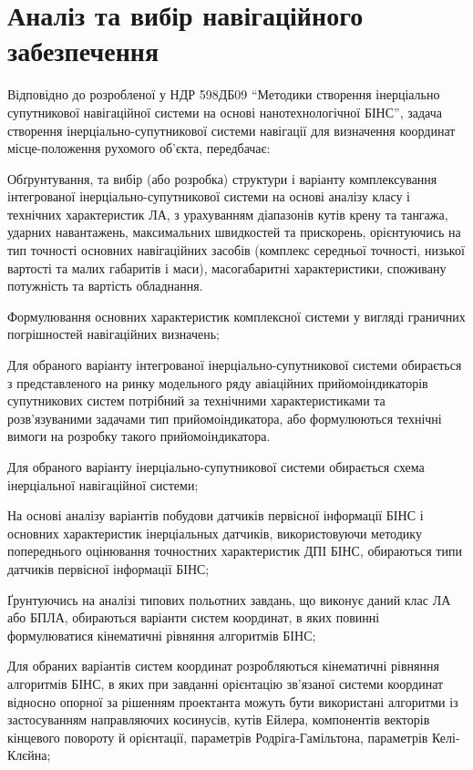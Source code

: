 \section{Аналіз та вибір навігаційного забезпечення}

Відповідно до розробленої у НДР 598ДБ09 ``Методики створення інерціально супутникової навігаційної системи на основі нанотехнологічної БІНС”, задача створення інерціально-супутникової системи навігації для визначення координат місце-положення рухомого об'єкта, передбачає:

Обґрунтування, та вибір (або розробка) структури і варіанту комплексування 
інтегрованої інерціально-супутникової системи на основі аналізу класу і 
технічних характеристик ЛА, з урахуванням діапазонів кутів крену та тангажа, 
ударних навантажень, максимальних швидкостей та прискорень, орієнтуючись на 
тип точності основних навігаційних засобів (комплекс середньої точності, 
низької вартості та малих габаритів і маси), масогабаритні характеристики, 
споживану потужність та вартість обладнання. 

Формулювання основних характеристик комплексної системи у вигляді граничних 
погрішностей навігаційних визначень;

Для обраного варіанту інтегрованої інерціально-супутникової системи 
обирається з представленого на ринку модельного ряду авіаційних 
прийомоіндикаторів супутникових систем потрібний за технічними 
характеристиками та розв'язуваними задачами тип прийомоіндикатора, або 
формулюються технічні вимоги  на розробку такого прийомоіндикатора. 

Для обраного варіанту інерціально-супутникової системи обирається схема 
інерціальної навігаційної системи;

На основі аналізу варіантів побудови датчиків первісної інформації БІНС
і основних характеристик інерціальных датчиків, використовуючи методику 
попереднього оцінювання точностних характеристик ДПІ 
БІНС, обираються типи датчиків первісної інформації БІНС;

Ґрунтуючись на аналізі типових польотних завдань, що виконує даний клас ЛА
або БПЛА, обираються варіанти систем координат, в яких повинні формулюватися 
кінематичні рівняння алгоритмів БІНС;

Для обраних варіантів систем координат розробляються кінематичні рівняння 
алгоритмів БІНС, в яких при завданні орієнтацію зв'язаної системи координат 
відносно опорної за рішенням проектанта можуть бути використані алгоритми 
із застосуванням направляючих косинусів, кутів Ейлера, компонентів векторів 
кінцевого повороту й орієнтації, параметрів Родріга-Гамільтона, параметрів 
Келі-Клєйна;

